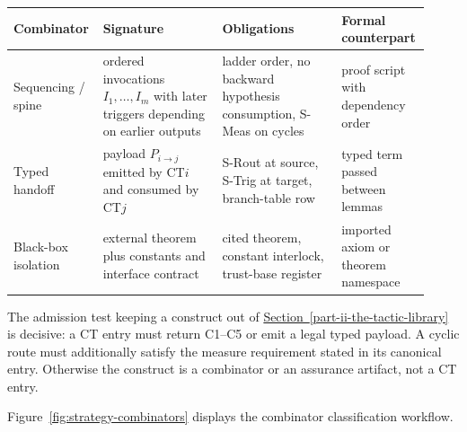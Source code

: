 \documentclass[
  11pt,
]{article}
\theoremstyle{definition}
\newcommand{\secref}[1]{\hyperref[#1]{Section~\ref*{#1}}}
\begin{document}
\begingroup
\small
\setlength{\tabcolsep}{2pt}
\begin{longtable}[]{@{}
  >{\raggedright\arraybackslash}p{0.18\linewidth}
  >{\raggedright\arraybackslash}p{0.28\linewidth}
  >{\raggedright\arraybackslash}p{0.28\linewidth}
  >{\raggedright\arraybackslash}p{0.18\linewidth}@{}}
\toprule\noalign{}
Combinator & Signature & Obligations & Formal counterpart \\
\midrule\noalign{}
\endhead
\bottomrule\noalign{}
\endlastfoot
Sequencing / spine & ordered invocations \(I_1,\ldots,I_m\) with later triggers depending on earlier outputs & ladder order, no backward hypothesis consumption, S-Meas on cycles & proof script with dependency order \\
Typed handoff & payload \(P_{i\to j}\) emitted by CT\(i\) and consumed by CT\(j\) & S-Rout at source, S-Trig at target, branch-table row & typed term passed between lemmas \\
Black-box isolation & external theorem plus constants and interface contract & cited theorem, constant interlock, trust-base register & imported axiom or theorem namespace \\
\end{longtable}
\endgroup

The admission test keeping a construct out of \secref{part-ii-the-tactic-library} is decisive: a
CT entry must return C1--C5 or emit a legal typed payload. A cyclic route
must additionally satisfy the measure requirement stated in its
canonical entry. Otherwise the construct is a combinator or an
assurance artifact, not a CT entry.

Figure~\ref{fig:strategy-combinators} displays the combinator
classification workflow.
\end{document}
